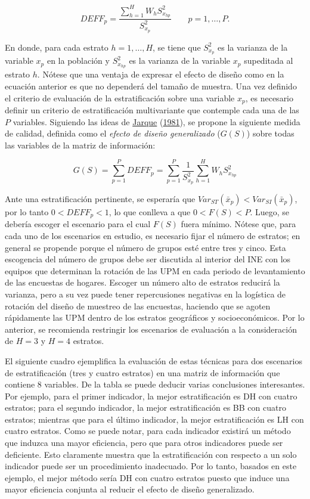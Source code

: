 \documentclass[
  12pt,
  spanish,
]{book}
\begin{document}
\[
DEFF_p = \frac{ \sum_{h=1}^H W_h S^2_{x_{hp}} }{S^2_{x_p}} \ \ \ \ \ \ \ \ \ p = 1, \ldots, P.
\]

En donde, para cada estrato \(h = 1, \ldots, H\), se tiene que \(S^2_{x_p}\) es la varianza de la variable \(x_p\) en la población y \(S^2_{x_{hp}}\) es la varianza de la variable \(x_p\) supeditada al estrato \(h\). Nótese que una ventaja de expresar el efecto de diseño como en la ecuación anterior es que no dependerá del tamaño de muestra. Una vez definido el criterio de evaluación de la estratificación sobre una variable \(x_p\), es necesario definir un criterio de estratificación multivariante que contemple cada una de las \(P\) variables. Siguiendo las ideas de \protect\hyperlink{ref-Jarque_1981}{Jarque} (\protect\hyperlink{ref-Jarque_1981}{1981}), se propone la siguiente medida de calidad, definida como el \emph{efecto de diseño generalizado} (\(G(S)\)) sobre todas las variables de la matriz de información:

\[
G(S) = \sum_{p=1}^P DEFF_p = \sum_{p=1}^P \frac{1}{S^2_{x_p}}\sum_{h=1}^H W_h S^2_{x_{hp}}
\]

Ante una estratificación pertinente, se esperaría que \(Var_{ST}(\bar x _p) < Var_{SI}(\bar x _p)\), por lo tanto \(0 < DEFF_p < 1\), lo que conlleva a que \(0 < F(S) < P\). Luego, se debería escoger el escenario para el cual \(F(S)\) fuera mínimo. Nótese que, para cada uno de los escenarios en estudio, es necesario fijar el número de estratos; en general se propende porque el número de grupos esté entre tres y cinco. Esta escogencia del número de grupos debe ser discutida al interior del INE con los equipos que determinan la rotación de las UPM en cada periodo de levantamiento de las encuestas de hogares. Escoger un número alto de estratos reducirá la varianza, pero a su vez puede tener repercusiones negativas en la logística de rotación del diseño de muestreo de las encuestas, haciendo que se agoten rápidamente las UPM dentro de los estratos geográficos y socioeconómicos. Por lo anterior, se recomienda restringir los escenarios de evaluación a la consideración de \(H=3\) y \(H=4\) estratos.

El siguiente cuadro ejemplifica la evaluación de estas técnicas para dos escenarios de estratificación (tres y cuatro estratos) en una matriz de información que contiene 8 variables. De la tabla se puede deducir varias conclusiones interesantes. Por ejemplo, para el primer indicador, la mejor estratificación es DH con cuatro estratos; para el segundo indicador, la mejor estratificación es BB con cuatro estratos; mientras que para el último indicador, la mejor estratificación es LH con cuatro estratos. Como se puede notar, para cada indicador existirá un método que induzca una mayor eficiencia, pero que para otros indicadores puede ser deficiente. Esto claramente muestra que la estratificación con respecto a un solo indicador puede ser un procedimiento inadecuado. Por lo tanto, basados en este ejemplo, el mejor método sería DH con cuatro estratos puesto que induce una mayor eficiencia conjunta al reducir el efecto de diseño generalizado.
\end{document}

